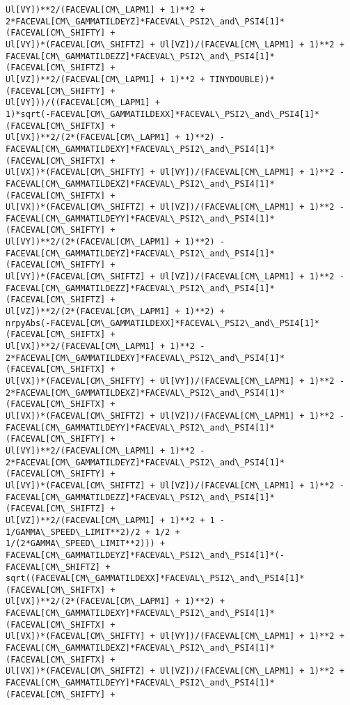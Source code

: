 \documentclass[landscape,letterpaper,10pt,english]{article}
\begin{document}
\begin{Verbatim}[commandchars=\\\{\}]
Ul[VY])**2/(FACEVAL[CM\_LAPM1] + 1)**2 +
2*FACEVAL[CM\_GAMMATILDEYZ]*FACEVAL\_PSI2\_and\_PSI4[1]*(FACEVAL[CM\_SHIFTY] +
Ul[VY])*(FACEVAL[CM\_SHIFTZ] + Ul[VZ])/(FACEVAL[CM\_LAPM1] + 1)**2 +
FACEVAL[CM\_GAMMATILDEZZ]*FACEVAL\_PSI2\_and\_PSI4[1]*(FACEVAL[CM\_SHIFTZ] +
Ul[VZ])**2/(FACEVAL[CM\_LAPM1] + 1)**2 + TINYDOUBLE))*(FACEVAL[CM\_SHIFTY] +
Ul[VY]))/((FACEVAL[CM\_LAPM1] +
1)*sqrt(-FACEVAL[CM\_GAMMATILDEXX]*FACEVAL\_PSI2\_and\_PSI4[1]*(FACEVAL[CM\_SHIFTX] +
Ul[VX])**2/(2*(FACEVAL[CM\_LAPM1] + 1)**2) -
FACEVAL[CM\_GAMMATILDEXY]*FACEVAL\_PSI2\_and\_PSI4[1]*(FACEVAL[CM\_SHIFTX] +
Ul[VX])*(FACEVAL[CM\_SHIFTY] + Ul[VY])/(FACEVAL[CM\_LAPM1] + 1)**2 -
FACEVAL[CM\_GAMMATILDEXZ]*FACEVAL\_PSI2\_and\_PSI4[1]*(FACEVAL[CM\_SHIFTX] +
Ul[VX])*(FACEVAL[CM\_SHIFTZ] + Ul[VZ])/(FACEVAL[CM\_LAPM1] + 1)**2 -
FACEVAL[CM\_GAMMATILDEYY]*FACEVAL\_PSI2\_and\_PSI4[1]*(FACEVAL[CM\_SHIFTY] +
Ul[VY])**2/(2*(FACEVAL[CM\_LAPM1] + 1)**2) -
FACEVAL[CM\_GAMMATILDEYZ]*FACEVAL\_PSI2\_and\_PSI4[1]*(FACEVAL[CM\_SHIFTY] +
Ul[VY])*(FACEVAL[CM\_SHIFTZ] + Ul[VZ])/(FACEVAL[CM\_LAPM1] + 1)**2 -
FACEVAL[CM\_GAMMATILDEZZ]*FACEVAL\_PSI2\_and\_PSI4[1]*(FACEVAL[CM\_SHIFTZ] +
Ul[VZ])**2/(2*(FACEVAL[CM\_LAPM1] + 1)**2) +
nrpyAbs(-FACEVAL[CM\_GAMMATILDEXX]*FACEVAL\_PSI2\_and\_PSI4[1]*(FACEVAL[CM\_SHIFTX] +
Ul[VX])**2/(FACEVAL[CM\_LAPM1] + 1)**2 -
2*FACEVAL[CM\_GAMMATILDEXY]*FACEVAL\_PSI2\_and\_PSI4[1]*(FACEVAL[CM\_SHIFTX] +
Ul[VX])*(FACEVAL[CM\_SHIFTY] + Ul[VY])/(FACEVAL[CM\_LAPM1] + 1)**2 -
2*FACEVAL[CM\_GAMMATILDEXZ]*FACEVAL\_PSI2\_and\_PSI4[1]*(FACEVAL[CM\_SHIFTX] +
Ul[VX])*(FACEVAL[CM\_SHIFTZ] + Ul[VZ])/(FACEVAL[CM\_LAPM1] + 1)**2 -
FACEVAL[CM\_GAMMATILDEYY]*FACEVAL\_PSI2\_and\_PSI4[1]*(FACEVAL[CM\_SHIFTY] +
Ul[VY])**2/(FACEVAL[CM\_LAPM1] + 1)**2 -
2*FACEVAL[CM\_GAMMATILDEYZ]*FACEVAL\_PSI2\_and\_PSI4[1]*(FACEVAL[CM\_SHIFTY] +
Ul[VY])*(FACEVAL[CM\_SHIFTZ] + Ul[VZ])/(FACEVAL[CM\_LAPM1] + 1)**2 -
FACEVAL[CM\_GAMMATILDEZZ]*FACEVAL\_PSI2\_and\_PSI4[1]*(FACEVAL[CM\_SHIFTZ] +
Ul[VZ])**2/(FACEVAL[CM\_LAPM1] + 1)**2 + 1 - 1/GAMMA\_SPEED\_LIMIT**2)/2 + 1/2 +
1/(2*GAMMA\_SPEED\_LIMIT**2))) +
FACEVAL[CM\_GAMMATILDEYZ]*FACEVAL\_PSI2\_and\_PSI4[1]*(-FACEVAL[CM\_SHIFTZ] +
sqrt((FACEVAL[CM\_GAMMATILDEXX]*FACEVAL\_PSI2\_and\_PSI4[1]*(FACEVAL[CM\_SHIFTX] +
Ul[VX])**2/(2*(FACEVAL[CM\_LAPM1] + 1)**2) +
FACEVAL[CM\_GAMMATILDEXY]*FACEVAL\_PSI2\_and\_PSI4[1]*(FACEVAL[CM\_SHIFTX] +
Ul[VX])*(FACEVAL[CM\_SHIFTY] + Ul[VY])/(FACEVAL[CM\_LAPM1] + 1)**2 +
FACEVAL[CM\_GAMMATILDEXZ]*FACEVAL\_PSI2\_and\_PSI4[1]*(FACEVAL[CM\_SHIFTX] +
Ul[VX])*(FACEVAL[CM\_SHIFTZ] + Ul[VZ])/(FACEVAL[CM\_LAPM1] + 1)**2 +
FACEVAL[CM\_GAMMATILDEYY]*FACEVAL\_PSI2\_and\_PSI4[1]*(FACEVAL[CM\_SHIFTY] +

\end{Verbatim}
\end{document}

